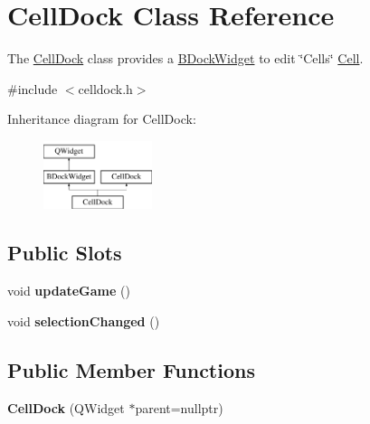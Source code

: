 \hypertarget{class_cell_dock}{\section{\-Cell\-Dock \-Class \-Reference}
\label{class_cell_dock}
}


\-The \hyperlink{class_cell_dock}{\-Cell\-Dock} class provides a \hyperlink{class_b_dock_widget}{\-B\-Dock\-Widget} to edit \char`\"{}\-Cells\char`\"{} \hyperlink{class_cell}{\-Cell}.  




{\ttfamily \#include $<$celldock.\-h$>$}

\-Inheritance diagram for \-Cell\-Dock\-:\begin{figure}[H]
\begin{center}
\leavevmode
\includegraphics[height=2.000000cm]{class_cell_dock}
\end{center}
\end{figure}
\subsection*{\-Public \-Slots}
\begin{DoxyCompactItemize}
\item 
\hypertarget{class_cell_dock_ac33251ff749bac9ec9bc85ae84eefd78}{void {\bfseries update\-Game} ()}\label{class_cell_dock_ac33251ff749bac9ec9bc85ae84eefd78}

\item 
\hypertarget{class_cell_dock_aa00bce4b3adaaf6d481f836b2e1a4f53}{void {\bfseries selection\-Changed} ()}\label{class_cell_dock_aa00bce4b3adaaf6d481f836b2e1a4f53}

\end{DoxyCompactItemize}
\subsection*{\-Public \-Member \-Functions}
\begin{DoxyCompactItemize}
\item 
\hypertarget{class_cell_dock_a0f424371a3e858864fdbba4b23b6fce7}{{\bfseries \-Cell\-Dock} (\-Q\-Widget $\ast$parent=nullptr)}\label{class_cell_dock_a0f424371a3e858864fdbba4b23b6fce7}

\end{DoxyCompactItemize}


